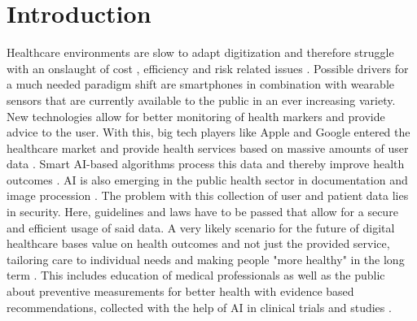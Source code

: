 \section{Introduction}
Healthcare environments are slow to adapt digitization \cite{industryDigitalization} and therefore struggle with an onslaught of cost \cite{EIU2016}, efficiency \cite{gopal2019digital} and risk related issues \cite{rodriguez2002illegible}. Possible drivers for a much needed paradigm shift are smartphones in combination with wearable sensors that are currently available to the public in an ever increasing variety. New technologies allow for better monitoring of health markers and provide advice to the user. With this, big tech players like Apple and Google entered the healthcare market and provide health services based on massive amounts of user data \cite{appleHealth}. Smart AI-based algorithms process this data and thereby improve health outcomes \cite{villar2015improving}. AI is also emerging in the public health sector in documentation and image procession \cite{kiKroenung}. The problem with this collection of user and patient data lies in security. Here, guidelines and laws have to be passed that allow for a secure and efficient usage of said data. A very likely scenario for the future of digital healthcare bases value on health outcomes and not just the provided service, tailoring care to individual needs and making people "more healthy" in the long term \cite{putera2017redefining}. This includes education of medical professionals \cite{adams2010nutrition} as well as the public about preventive measurements for better health with evidence based recommendations, collected with the help of AI in clinical trials and studies \cite{rehme2014identifying}.


